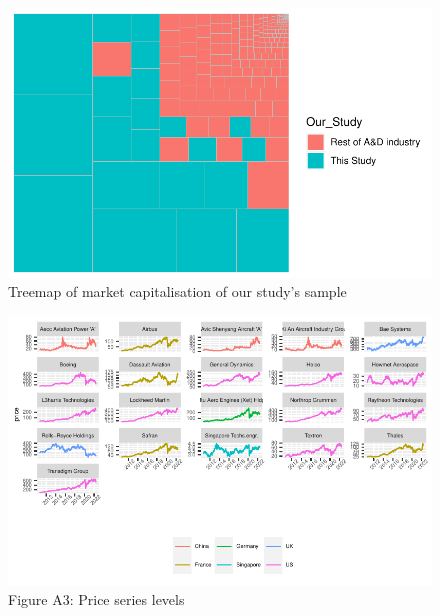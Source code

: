 \documentclass[
  letterpaper,
  DIV=11,
  numbers=noendperiod]{scrartcl}
\begin{document}
\begin{figure}[H]

{\centering \includegraphics{defenceRR_files/figure-pdf/fig-mktcapshare-1.pdf}

}

\caption{\label{fig-mktcapshare}Treemap of market capitalisation of our
study's sample}

\end{figure}

\begin{figure}[H]

{\centering \includegraphics{defenceRR_files/figure-pdf/fig-prices-1.pdf}

}

\caption{\label{fig-prices}Figure A3: Price series levels}

\end{figure}
\end{document}
